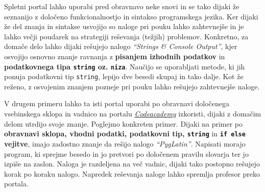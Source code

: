 Spletni portal lahko uporabi pred obravnavo neke snovi in se tako
dijaki že seznanijo z določeno funkcionalnostjo in sintakso
programskega jezika. Ker dijaki že del znanja in sintakse usvojijo so
naloge pri pouku lahko zahtevnejše in je lahko večji poudarek na
strategiji reševanja (težjih) problemov. Konkretno, za domače delo
lahko dijaki rešujejo nalogo \emph{``Strings \& Console Output''}, kjer
osvojijo osnovno znanje ravnanja z \textbf{pisanjem izhodnih podatkov}
in \textbf{podatkovnega tipa \texttt{string} oz. \texttt{niza}}. Naučijo se
uporabljati metode, ki jih ponuja podatkovni tip \texttt{string},
lepijo dve besedi skupaj in tako dalje. Kot že reženo, z osvojenim
znanjem pozneje pri pouku lahko rešujejo zahtevnejše naloge.

V drugem primeru lahko ta isti portal uporabi po obravnavi določenega
vsebinskega sklopa in vadnico na portalu
\emph{\href{https://www.codecademy.com/}{Codeacademy}}
\cite{web:codeacademy} izkoristi, dijaki z domačim delom utrdijo svoje
znanje. Poglejmo konkreten primer.  Dijaki na primer po
\textbf{obravnavi sklopa, vhodni podatki, podatkovni tip,
  \texttt{string}} in \textbf{\texttt{if else} vejitve}, imajo
zadostno znanje da rešijo nalogo \emph{``PygLatin''}. Napisati morajo
program, ki sprejme besedo in jo pretvori po določenem pravilu
slovarja ter jo izpiše na zaslon. Naloga je razdeljena na več vadnic,
dijaki tako postopno rešujejo korak po koraku nalogo. Napredek
reševanja naloge lahko spremlja profesor preko portala.

